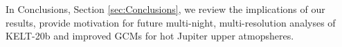 \documentclass[twocolumn]{aastex631}
\begin{document}
    
        In Conclusions, Section \ref{sec:Conclusions}, we review the implications of our results, provide motivation for future multi-night, multi-resolution analyses of KELT-20b and improved GCMs for hot Jupiter upper atmopsheres.

    \vspace{5mm}




\appendix  
\end{document}
